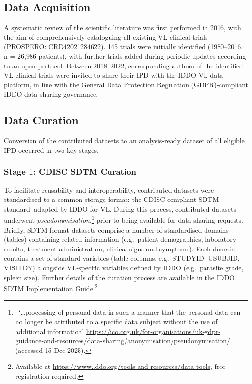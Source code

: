\subsection{Data Acquisition}

A systematic review of the scientific literature was first performed in 2016, with the aim of comprehensively cataloguing all existing VL clinical trials (PROSPERO: \href{https://www.crd.york.ac.uk/PROSPERO/view/CRD42021284622}{CRD42021284622})\cite{bush2017}. 145 trials were initially identified (1980--2016, n = 26,986 patients), with further trials added during periodic updates according to an open protocol\cite{Singh-Phulgenda2022_IDDO_VL_protocol}. Between 2018--2022, corresponding authors of the identified VL clinical trials were invited to share their IPD with the IDDO VL data platform, in line with the General Data Protection Regulation (GDPR)-compliant IDDO data sharing governance\cite{IDDO_DataGovernance, dahal2025}.

\subsection{Data Curation}

Conversion of the contributed datasets to an analysis-ready dataset of all eligible IPD occurred in two key stages.

\subsubsection{Stage 1: CDISC SDTM Curation}

To facilitate reusability and interoperability, contributed datasets were standardised to a common storage format: the CDISC-compliant SDTM standard\cite{cdisc2024}, adapted by IDDO for VL\cite{iddo2020}. During this process, contributed datasets underwent \textit{pseudonymisation},\footnote{\ `\dots processing of personal data in such a manner that the personal data can no longer be attributed to a specific data subject without the use of additional information' \url{https://ico.org.uk/for-organisations/uk-gdpr-guidance-and-resources/data-sharing/anonymisation/pseudonymisation/} (accessed 15 Dec 2025).} prior to being available for data sharing requests. Briefly, SDTM format datasets comprise a number of standardised domains (tables) containing related information (e.g.\ patient demographics, laboratory results, treatment administration, clinical signs and symptoms). Each domain contains a set of standard variables (table columns, e.g.\ STUDYID, USUBJID, VISITDY) alongside VL-specific variables defined by IDDO (e.g.\ parasite grade, spleen size). Further details of the curation process are available in the \href{https://www.iddo.org/tools-and-resources/data-tools}{IDDO SDTM Implementation Guide}.\footnote{Available at \url{https://www.iddo.org/tools-and-resources/data-tools}, free registration required.}


